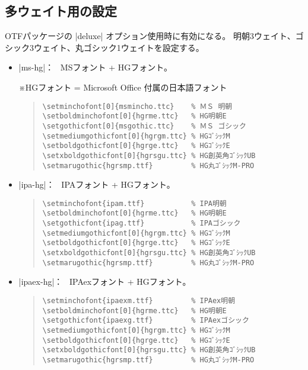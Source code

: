 \documentclass[a4paper,uplatex]{jsarticle}
\newcommand{\Pkg}[1]{\textsf{#1}}
\newcommand{\Note}{\par\noindent ※}
\newcommand{\Means}{：\ }
\begin{document}
\subsection{多ウェイト用の設定}

\Pkg{OTF}パッケージの |deluxe| オプション使用時に有効になる。
明朝3ウェイト、ゴシック3ウェイト、丸ゴシック1ウェイトを設定する。

\begin{itemize}
\item |ms-hg|\Means
  MSフォント + HGフォント。
  \Note HGフォント = Microsoft Office 付属の日本語フォント
\begin{quote}\small\begin{verbatim}
\setminchofont[0]{msmincho.ttc}    % ＭＳ 明朝
\setboldminchofont[0]{hgrme.ttc}   % HG明朝E
\setgothicfont[0]{msgothic.ttc}    % ＭＳ ゴシック
\setmediumgothicfont[0]{hgrgm.ttc} % HGｺﾞｼｯｸM
\setboldgothicfont[0]{hgrge.ttc}   % HGｺﾞｼｯｸE
\setxboldgothicfont[0]{hgrsgu.ttc} % HG創英角ｺﾞｼｯｸUB
\setmarugothic{hgrsmp.ttf}         % HG丸ｺﾞｼｯｸM-PRO 
\end{verbatim}\end{quote}

\item |ipa-hg|\Means
   IPAフォント + HGフォント。
\begin{quote}\small\begin{verbatim}
\setminchofont{ipam.ttf}           % IPA明朝
\setboldminchofont[0]{hgrme.ttc}   % HG明朝E
\setgothicfont{ipag.ttf}           % IPAゴシック
\setmediumgothicfont[0]{hgrgm.ttc} % HGｺﾞｼｯｸM
\setboldgothicfont[0]{hgrge.ttc}   % HGｺﾞｼｯｸE
\setxboldgothicfont[0]{hgrsgu.ttc} % HG創英角ｺﾞｼｯｸUB
\setmarugothic{hgrsmp.ttf}         % HG丸ｺﾞｼｯｸM-PRO 
\end{verbatim}\end{quote}

\item |ipaex-hg|\Means
   IPAexフォント + HGフォント。
\begin{quote}\small\begin{verbatim}
\setminchofont{ipaexm.ttf}         % IPAex明朝
\setboldminchofont[0]{hgrme.ttc}   % HG明朝E
\setgothicfont{ipaexg.ttf}         % IPAexゴシック
\setmediumgothicfont[0]{hgrgm.ttc} % HGｺﾞｼｯｸM
\setboldgothicfont[0]{hgrge.ttc}   % HGｺﾞｼｯｸE
\setxboldgothicfont[0]{hgrsgu.ttc} % HG創英角ｺﾞｼｯｸUB
\setmarugothic{hgrsmp.ttf}         % HG丸ｺﾞｼｯｸM-PRO 
\end{verbatim}\end{quote}


\end{itemize}
\end{document}
